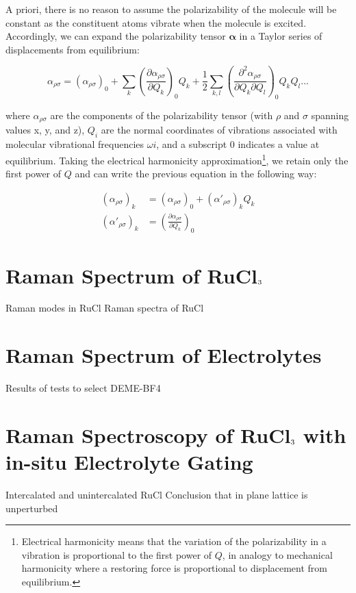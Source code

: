 A priori, there is no reason to assume the polarizability of the molecule will be constant as the constituent atoms vibrate when the molecule is excited. Accordingly, we can expand the polarizability tensor $\boldsymbol{\alpha}$ in a Taylor series of displacements from equilibrium:

\begin{equation}
\alpha_{\rho \sigma} = (\alpha_{\rho \sigma})_{0} + \sum_{k} \left( \frac{\partial \alpha_{\rho \sigma}}{\partial Q_{k}} \right)_{0} Q_{k} + \frac{1}{2} \sum_{k,l} \left( \frac{\partial^{2} \alpha_{\rho \sigma}}{\partial Q_{k} \partial Q_{l}} \right)_{0} Q_{k} Q_{l} ...
\end{equation}

where $\alpha_{\rho \sigma}$ are the components of the polarizability tensor (with $\rho$ and $\sigma$ spanning values x, y, and z), $Q_{i}$ are the normal coordinates of vibrations associated with molecular vibrational frequencies $\omega{i}$, and a subscript 0 indicates a value at equilibrium. Taking the electrical harmonicity approximation\footnote{Electrical harmonicity means that the variation of the polarizability in a vibration is proportional to the first power of $Q$, in analogy to mechanical harmonicity where a restoring force is proportional to displacement from equilibrium.}, we retain only the first power of $Q$ and can write the previous equation in the following way:

\begin{equation}
\begin{aligned}
	(\alpha_{\rho \sigma})_{k} &= (\alpha_{\rho \sigma})_{0} + (\alpha'_{\rho \sigma})_{k} Q_{k} \\
	(\alpha'_{\rho \sigma})_{k} &= \left( \frac{\partial \alpha_{\rho \sigma}}{\partial Q_{k}} \right)_{0}
\end{aligned}
\end{equation}




\section{Raman Spectrum of RuCl$\textsubscript{3}$}
Raman modes in RuCl
Raman spectra of RuCl

\section{Raman Spectrum of Electrolytes}
Results of tests to select DEME-BF4

\section{Raman Spectroscopy of RuCl$\textsubscript{3}$ with in-situ Electrolyte Gating}
Intercalated and unintercalated RuCl
Conclusion that in plane lattice is unperturbed